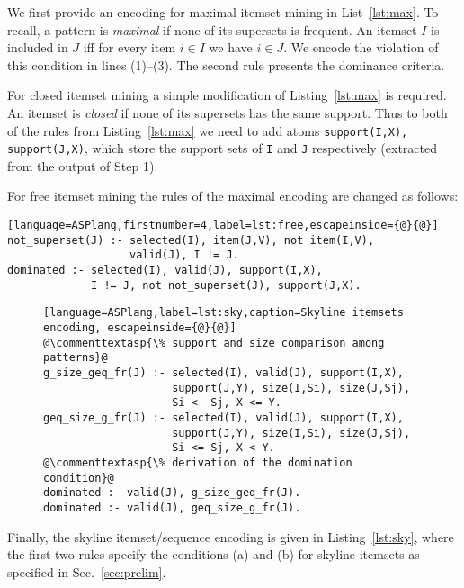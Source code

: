  We first provide an encoding for maximal itemset mining in List~\ref{lst:max}. To recall, a pattern is \emph{maximal} if none of its supersets is frequent. An itemset $I$ is included in $J$ iff for every item $i\in I$ we have  $i\in J$. We encode the violation of this condition in lines (1)--(3). The second rule presents the dominance criteria.

For closed itemset mining a simple modification of Listing~\ref{lst:max} is required. An itemset is \emph{closed} if none of its supersets has the same support. Thus to both of the rules from Listing~\ref{lst:max} we need to add atoms \texttt{support(I,X), support(J,X)}, which store the support sets of \texttt{I} and \texttt{J} respectively (extracted from the output of Step 1).  


For free itemset mining the rules of the maximal encoding are changed as follows:
\medskip

\small{\begin{lstlisting}[language=ASPlang,firstnumber=4,label=lst:free,escapeinside={@}{@}]
not_superset(J) :- selected(I), item(J,V), not item(I,V), 
                   valid(J), I != J.
dominated :- selected(I), valid(J), support(I,X),
             I != J, not not_superset(J), support(J,X).
\end{lstlisting}}



\begin{figure}[t]
\small{\begin{lstlisting}[language=ASPlang,label=lst:sky,caption=Skyline itemsets encoding, escapeinside={@}{@}]
@\commenttextasp{\% support and size comparison among patterns}@
g_size_geq_fr(J) :- selected(I), valid(J), support(I,X), 
                    support(J,Y), size(I,Si), size(J,Sj), 
                    Si <  Sj, X <= Y. 
geq_size_g_fr(J) :- selected(I), valid(J), support(I,X), 
                    support(J,Y), size(I,Si), size(J,Sj), 
                    Si <= Sj, X < Y. 
@\commenttextasp{\% derivation of the domination condition}@
dominated :- valid(J), g_size_geq_fr(J). 
dominated :- valid(J), geq_size_g_fr(J). 
\end{lstlisting}}
\end{figure}
\normalsize{Finally, the skyline itemset/sequence encoding is given in Listing~\ref{lst:sky}, where the first two rules specify the conditions (a) and (b) for skyline itemsets as specified in Sec.~\ref{sec:prelim}. }

